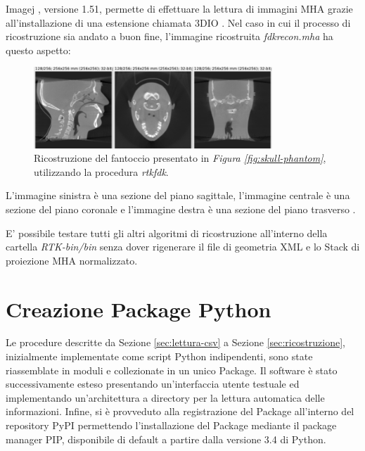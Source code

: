 \documentclass[a4paper,12pt, doubleside]{report}
\begin{document}
            \bigskip    
            \par
                Imagej \cite{imagej}, versione 1.51, permette di effettuare la lettura di immagini MHA grazie all'installazione di una estensione chiamata 3DIO \cite{imagej-3dio-plugin}. Nel caso in cui il processo di ricostruzione sia andato a buon fine, l'immagine ricostruita \textit{fdk\textunderscore recon.mha} ha questo aspetto:
                    
                \begin{figure}[h]        
                    \centering
                    \includegraphics[width=0.8\textwidth]{reconstruction}
                    \caption{Ricostruzione del fantoccio presentato in \textit{Figura \ref{fig:skull-phantom}}, utilizzando la procedura \textit{rtkfdk}.}
                    \label{fig:reconstruction}
                \end{figure}
                
                L'immagine sinistra è una sezione del piano sagittale, l'immagine centrale è una sezione del piano coronale e l'immagine destra è una sezione del piano trasverso \cite{planes}.
                
            \bigskip
            \par
                E' possibile testare tutti gli altri algoritmi di ricostruzione all'interno della cartella \textit{RTK-bin/bin} senza dover rigenerare il file di geometria XML e lo Stack di proiezione MHA normalizzato. 
            
            
    \chapter{Creazione Package Python}
        \par
            Le procedure descritte da Sezione \ref{sec:lettura-csv} a Sezione \ref{sec:ricostruzione}, inizialmente implementate come script Python indipendenti, sono state riassemblate in moduli e collezionate in un unico Package. Il software è stato successivamente esteso presentando un'interfaccia utente testuale ed implementando un'architettura a directory per la lettura automatica delle informazioni. Infine, si è provveduto alla registrazione del Package all'interno del repository PyPI permettendo l'installazione del Package mediante il package manager PIP, disponibile di default a partire dalla versione 3.4 di Python.
            
\end{document}
